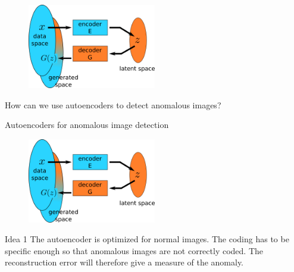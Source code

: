 \documentclass[xcolor=pdftex,dvipsnames,table,mathserif,aspectratio=169]{beamer}
\begin{document}
\begin{frame}{}

  \begin{figure}[ht]
    \centering
    \includegraphics[width=0.5\textwidth]{ae.png}
  \end{figure}

  \begin{alertblock}{}
  How can we use autoencoders to detect anomalous images?
\end{alertblock}

\end{frame}


\begin{frame}{Autoencoders for anomalous image detection}

  \begin{figure}[ht]
    \centering
    \includegraphics[width=0.5\textwidth]{ae.png}
  \end{figure}

  \begin{block}{Idea 1}
    The autoencoder is optimized for normal images. The coding has to be specific enough so that anomalous images are not correctly coded. The reconstruction error will therefore give a measure of the anomaly.
  \end{block}

\end{frame}
\end{document}
